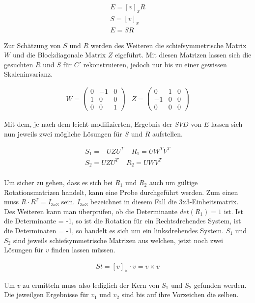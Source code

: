 \begin{gather}
E=[v]_xR\\
S =[v]_x\\
E=SR
\end{gather}

Zur Schätzung von $S$ und $R$ werden des Weiteren die schiefsymmetrische Matrix \ensuremath{W} und die Blockdiagonale Matrix \ensuremath{Z} eigeführt\cite{HZ}. Mit diesen Matrizen lassen sich die gesuchten $R$ und $S$ für $C'$ rekonstruieren, jedoch nur bis zu einer gewissen Skaleninvarianz\cite{HZ,Ferid}.


\begin{gather}
W = \begin{pmatrix}
0&-1&0\\
1&0&0\\
0&0&1
\end{pmatrix} \;\;\;
Z=
\begin{pmatrix}
0&1&0\\
-1&0&0\\
0&0&0
\end{pmatrix}
\end{gather}

Mit dem, je nach dem leicht modifizierten, Ergebnis der $SVD$ von \ensuremath{E} lassen sich nun jeweils zwei mögliche Lösungen für $S$ und $R$ aufstellen.


\begin{gather}
S_1 = -UZU^T \;\;\;\; R_1 = UW^TV^T\\
S_2 = UZU^T \;\;\;\; R_2 = UWV^T
\end{gather}\\


Um sicher zu gehen, dass es sich bei \ensuremath{R_1} und \ensuremath{R_2} auch um gültige Rotationsmatrizen handelt, kann eine Probe durchgeführt werden. Zum einen muss \ensuremath{R\cdot R^T=I_{3x3}} sein. \ensuremath{I_{3x3}} bezeichnet in diesem Fall die 3x3-Einheitsmatrix. Des Weiteren kann man überprüfen, ob die Determinante \ensuremath{det(R_1) = 1} ist. Ist die Determinante = -1, so ist die Rotation für ein Rechtsdrehendes System, ist die Determinaten = -1, so handelt es sich um ein linksdrehendes System\cite{HZ}. $S_1$ und $S_2$ sind jeweils schiefsymmetrische Matrizen aus welchen, jetzt noch zwei Lösungen für $v$ finden lassen müssen\cite{HZ}. 

\begin{gather}
St = [v]_\times \cdot v = v \times v
\end{gather} 

Um $v$ zu ermitteln muss also lediglich der Kern von $S_1$ und $S_2$ gefunden werden. Die jeweilgen Ergebnisse für $v_1$ und $v_2$ sind bis auf ihre Vorzeichen die selben.


